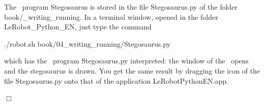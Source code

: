 \begin{corrige}{
The \python\ program {\idt Ste\-go\-sau\-rus} is stored in the
file {\idt Stegosaurus.py} of the folder {\idt book/\_writing\_running}.
In a terminal window, opened in the folder {\idt LeRobot\_Python\_EN}, just
type the command
\begin{center}
{\idt ./robot.sh book/04\_writing\_running/Stegosaurus.py}
\end{center}
which has the \python\ program {\idt Stegosaurus.py} interpreted: the window of the \robot\ opens
and the stegosaurus is drawn. You get the same result by dragging the icon of the
file {\idt Stegosaurus.py} onto that of the application {\idt LeRobotPythonEN.app}.

\noindent $\Box$}\end{corrige}

